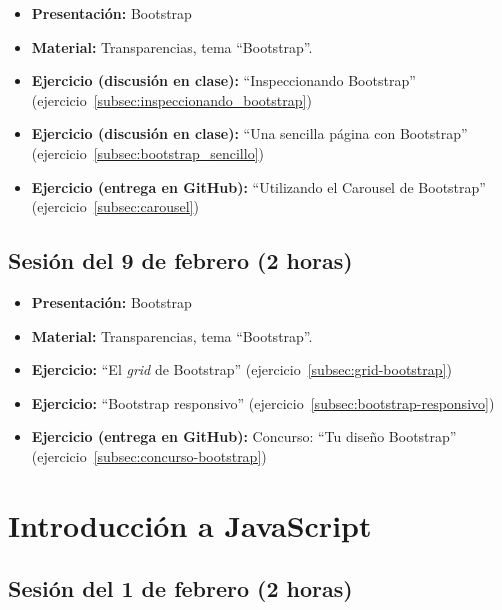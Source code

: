 \documentclass[a4paper,12pt]{report}
\begin{document}
\begin{itemize}
\item \textbf{Presentación:} Bootstrap
\item \textbf{Material:} Transparencias, tema ``Bootstrap''.
\item \textbf{Ejercicio (discusión en clase):} ``Inspeccionando Bootstrap'' (ejercicio~\ref{subsec:inspeccionando_bootstrap})
\item \textbf{Ejercicio (discusión en clase):} ``Una sencilla página con Bootstrap'' (ejercicio~\ref{subsec:bootstrap_sencillo})
\item \textbf{Ejercicio (entrega en GitHub):} ``Utilizando el Carousel de Bootstrap'' (ejercicio~\ref{subsec:carousel})

\end{itemize}

\subsection{Sesión del 9 de febrero (2 horas)}

\begin{itemize}
\item \textbf{Presentación:} Bootstrap
\item \textbf{Material:} Transparencias, tema ``Bootstrap''.
\item \textbf{Ejercicio:} ``El \emph{grid} de Bootstrap'' (ejercicio~\ref{subsec:grid-bootstrap})
\item \textbf{Ejercicio:} ``Bootstrap responsivo'' (ejercicio~\ref{subsec:bootstrap-responsivo})
\item \textbf{Ejercicio (entrega en GitHub):} Concurso: ``Tu diseño Bootstrap'' (ejercicio~\ref{subsec:concurso-bootstrap})
\end{itemize}




\section{Introducción a JavaScript}

\subsection{Sesión del 1 de febrero (2 horas)}
\end{document}
